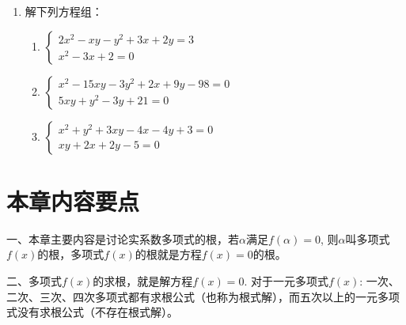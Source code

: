 \begin{enumerate}
\item 解下列方程组：
\begin{enumerate}
    \item $\begin{cases}
      2x^2-xy-y^2+3x+2y=3\\
      x^2-3x+2=0  
    \end{cases}$
    \item $\begin{cases}
        x^2-15xy-3y^2+2x+9y-98=0\\
        5xy+y^2-3y+21=0
    \end{cases}$
    \item $\begin{cases}
        x^2+y^2+3xy-4x-4y+3=0\\
        xy+2x+2y-5=0
    \end{cases}$
    
\end{enumerate}


\end{enumerate}

\section*{本章内容要点}


一、本章主要内容是讨论实系数多项式的根，若$\alpha$满足$f(\alpha)=0$, 则$\alpha$叫多项式$f(x)$的根，多项式$f(x)$的根就是方程$f(x)=0$的根。

二、多项式$f(x)$的求根，就是解方程$f(x)=0$. 对于一元多项式$f(x)$: 一次、二次、三次、四次多项式都有求根公式（也称为根式解），而五次以上的一元多项式没有求根公式（不存在根式解）。


